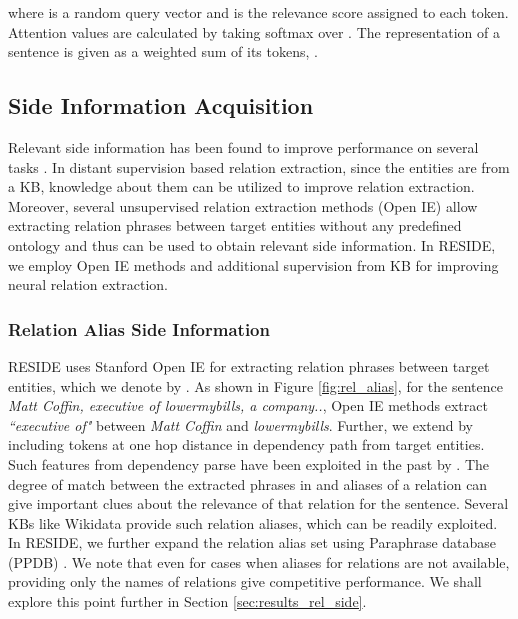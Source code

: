 \documentclass[11pt,a4paper]{article}
\newcommand{\reffig}[1]{Figure \ref{#1}}
\newcommand{\refsec}[1]{Section \ref{#1}}
\newcommand{\method}{RESIDE}
\newcommand{\stepTwo}{Side Information Acquisition}
\begin{document}
where  is a random query vector and  is the relevance score assigned to each token. Attention values  are calculated by taking softmax over . The representation of a sentence is given as a weighted sum of its tokens,
.


\subsection{\stepTwo{}}
\label{sec:sideinfo}

Relevant side information has been found to improve performance on several tasks \cite{figer_paper,cesi_paper}. In distant supervision based relation extraction, since the entities are from a KB, knowledge about them can be utilized to improve relation extraction. Moreover, several unsupervised relation extraction methods (Open IE) \cite{stanford_openie,ollie} allow extracting relation phrases between target entities without any predefined ontology and thus can be used to obtain relevant side information. In \method{}, we employ Open IE methods and additional supervision from KB for improving neural relation extraction. 

\subsubsection*{Relation Alias Side Information}
\label{sec:alias_sideinfo}


\method{} uses Stanford Open IE \cite{stanford_openie} for extracting relation phrases between target entities, which we denote by . As shown in \reffig{fig:rel_alias}, for the sentence \textit{Matt Coffin, executive of lowermybills, a company..}, Open IE methods extract \textit{``executive of"} between \textit{Matt Coffin} and \textit{lowermybills}. Further, we extend  by including tokens at one hop distance in dependency path from target entities. Such features from dependency parse have been exploited in the past by \cite{mintz2009distant,see_paper}. The degree of match between the extracted phrases in  and aliases of a relation can give important clues about the relevance of that relation for the sentence. Several KBs like Wikidata provide such relation aliases, which can be readily exploited. In \method{}, we further expand the relation alias set using Paraphrase database (PPDB) \cite{ppdb2_paper}. We note that even for cases when aliases for relations are not available, providing only the names of relations give competitive performance. We shall explore this point further in  \refsec{sec:results_rel_side}.
\end{document}
